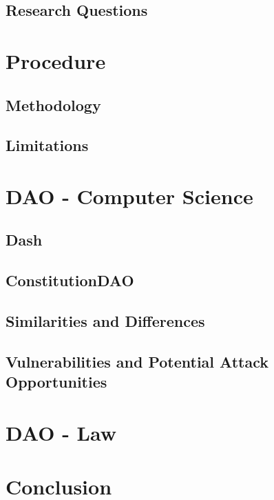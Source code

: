 \documentclass[a4paper,12pt]{report}
\begin{document}
	\section{Research Questions}
	\startsection
	\closesection
	
	
	\chapter{Procedure}
	
	\section{Methodology}
	\startsection
	\closesection
	
	\section{Limitations}
	\startsection
	\closesection
	
	
	\chapter{DAO - Computer Science}
	
	\section{Dash}
	\startsection
	\closesection
	
	\section{ConstitutionDAO}
	\startsection
	\closesection
	
	\section{Similarities and Differences}
	\startsection
	\closesection
	
	\section{Vulnerabilities and Potential Attack Opportunities}
	\startsection
	\closesection
	
	
	\chapter{DAO - Law}
		
	
	\chapter{Conclusion}
\end{document}
